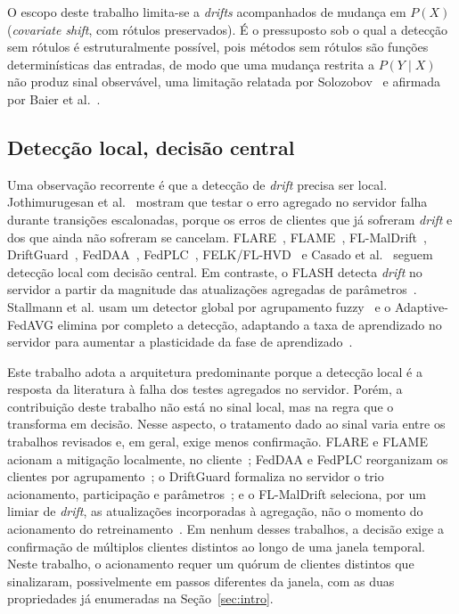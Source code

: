 \documentclass[conference]{IEEEtran}
\begin{document}
O escopo deste trabalho limita-se a \textit{drifts} acompanhados de mudança em $P(X)$ (\textit{covariate shift}, com rótulos preservados). É o pressuposto sob o qual a detecção sem rótulos é estruturalmente possível, pois métodos sem rótulos são funções determinísticas das entradas, de modo que uma mudança restrita a $P(Y\mid X)$ não produz sinal observável, uma limitação relatada por Solozobov~\cite{solozobov2026} e afirmada por Baier et al.~\cite{baier2023}.

\subsection{Detecção local, decisão central}

Uma observação recorrente é que a detecção de \textit{drift} precisa ser local. Jothimurugesan et al.~\cite{jothimurugesan2023} mostram que testar o erro agregado no servidor falha durante transições escalonadas, porque os erros de clientes que já sofreram \textit{drift} e dos que ainda não sofreram se cancelam. FLARE~\cite{chow2023}, FLAME~\cite{mavromatis2024}, FL-MalDrift~\cite{patel2026}, DriftGuard~\cite{han2026}, FedDAA~\cite{fu2025}, FedPLC~\cite{zhou2026}, FELK/FL-HVD~\cite{chen2026} e Casado et al.~\cite{casado2022} seguem detecção local com decisão central. Em contraste, o FLASH detecta \textit{drift} no servidor a partir da magnitude das atualizações agregadas de parâmetros~\cite{panchal2023}. Stallmann et al. usam um detector global por agrupamento fuzzy~\cite{stallmann2024} e o Adaptive-FedAVG elimina por completo a detecção, adaptando a taxa de aprendizado no servidor para aumentar a plasticidade da fase de aprendizado~\cite{canonaco2021}.

Este trabalho adota a arquitetura predominante porque a detecção local é a resposta da literatura à falha dos testes agregados no servidor. Porém, a contribuição deste trabalho não está no sinal local, mas na regra que o transforma em decisão. Nesse aspecto, o tratamento dado ao sinal varia entre os trabalhos revisados e, em geral, exige menos confirmação. FLARE e FLAME acionam a mitigação localmente, no cliente~\cite{chow2023,mavromatis2024}; FedDAA e FedPLC reorganizam os clientes por agrupamento~\cite{fu2025,zhou2026}; o DriftGuard formaliza no servidor o trio acionamento, participação e parâmetros~\cite{han2026}; e o FL-MalDrift seleciona, por um limiar de \textit{drift}, as atualizações incorporadas à agregação, não o momento do acionamento do retreinamento~\cite{patel2026}. Em nenhum desses trabalhos, a decisão exige a confirmação de múltiplos clientes distintos ao longo de uma janela temporal. Neste trabalho, o acionamento requer um quórum de clientes distintos que sinalizaram, possivelmente em passos diferentes da janela, com as duas propriedades já enumeradas na Seção~\ref{sec:intro}.
\end{document}
